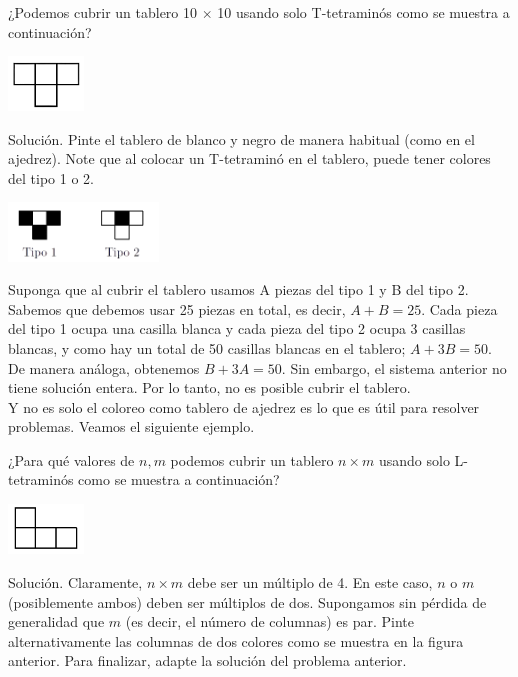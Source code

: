 \documentclass[11pt]{scrartcl}
\begin{document}
\begin{example}
    ¿Podemos cubrir un tablero 10 $\times$ 10 usando solo T-tetraminós como se muestra a continuación?
    \begin{center}
        \includegraphics[width=2cm]{images/clase_combi_centro_09_title.png}
    \end{center}
\end{example}
Solución. Pinte el tablero de blanco y negro de manera habitual (como en el ajedrez). Note que al colocar un T-tetraminó en el tablero, puede tener colores del tipo 1 o 2.
\begin{center}
    \includegraphics[width=4cm]{images/clase_combi_centro_09_title_solucion.png}
\end{center}
Suponga que al cubrir el tablero usamos A piezas del tipo 1 y B del tipo 2. Sabemos que debemos usar 25 piezas en total, es decir, $A + B = 25$. Cada pieza del tipo 1 ocupa una casilla blanca y cada pieza del tipo 2 ocupa 3 casillas blancas, y como hay un total de 50 casillas blancas en el tablero; $A + 3B = 50$. De manera análoga, obtenemos $B + 3A = 50$. Sin embargo, el sistema anterior no tiene solución entera. Por lo tanto, no es posible cubrir el tablero.\\

Y no es solo el coloreo como tablero de ajedrez es lo que es útil para resolver problemas. Veamos el siguiente ejemplo.

\begin{example}
    ¿Para qué valores de \(n, m\) podemos cubrir un tablero \(n \times m\) usando solo L-tetraminós como se muestra a continuación?
    \begin{center}
        \includegraphics[width=2cm]{images/clase_combi_centro_09_ele.png}
    \end{center}
\end{example}
Solución. Claramente, $n \times m$ debe ser un múltiplo de 4. En este caso, \(n\) o \(m\) (posiblemente ambos) deben ser múltiplos de dos. Supongamos sin pérdida de generalidad que $m$ (es decir, el número de columnas) es par. Pinte alternativamente las columnas de dos colores como se muestra en la figura anterior. Para finalizar, adapte la solución del problema anterior.
\end{document}
